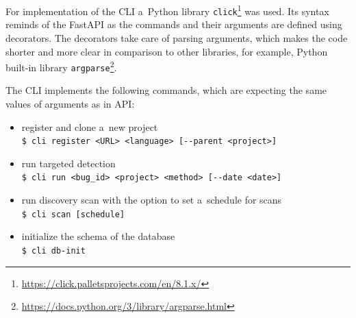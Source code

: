   For implementation of the CLI a~Python library \texttt{click}\footnote{\href{https://click.palletsprojects.com/en/8.1.x/}
  {https://click.palletsprojects.com/en/8.1.x/}} was used. Its syntax reminds of the FastAPI as the commands and their arguments
  are defined using decorators. The decorators take care of parsing arguments, which makes the code shorter and more clear
  in comparison to other libraries, for example, Python built-in library \texttt{argparse}\footnote{\href{
  https://docs.python.org/3/library/argparse.html}{https://docs.python.org/3/library/argparse.html}}.

  The CLI implements the following commands, which are expecting the same values of arguments as in API:
  \begin{itemize}
      \item register and clone a~new project\\
      \texttt{\$ cli register <URL> <language> [\texttt{-}\texttt{-}parent <project>]}
      \item run targeted detection\\
      \texttt{\$ cli run <bug\_id> <project> <method> [\texttt{-}\texttt{-}date <date>]}
      \item run discovery scan with the option to set a~schedule for scans\\
      \texttt{\$ cli scan [schedule]}
      \item initialize the schema of the database \\
      \texttt{\$ cli db-init}
  \end{itemize}
